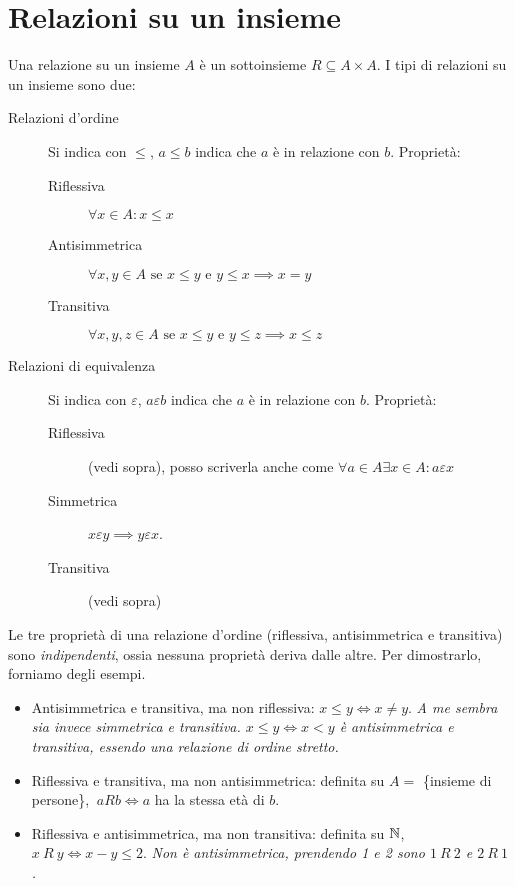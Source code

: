 \section{Relazioni su un insieme}

Una relazione su un insieme $A$ \`e un sottoinsieme $R \subseteq A \times A$. I tipi di relazioni su un insieme sono due:

\begin{description}
    \item[Relazioni d'ordine] Si indica con $\le$, $a \leq b$ indica che $a$ \`e in relazione con $b$. Propriet\`a:
    \begin{description}
        \item [Riflessiva] $\forall x \in A : x \leq x$
        \item [Antisimmetrica] $\forall x, y \in A \text{ se } x \leq y \text{ e }  y \leq x \implies x = y$
        \item [Transitiva] $\forall x, y, z \in A \text{ se } x \leq y \text{ e } y \leq z \implies x \leq z$
    \end{description}
    \item[Relazioni di equivalenza] Si indica con $\varepsilon$, $a \varepsilon b$ indica che $a$ \`e in relazione con $b$. Propriet\`a:
    \begin{description}
      \item [Riflessiva] (vedi sopra), posso scriverla anche come $\forall a \in A \exists x \in A : a \varepsilon x$
      \item [Simmetrica] $x \varepsilon y \implies y \varepsilon x$.
      \item [Transitiva] (vedi sopra)
    \end{description}
\end{description}

Le tre propriet\`a di una relazione d'ordine (riflessiva, antisimmetrica e transitiva) sono \textit{indipendenti}, ossia nessuna propriet\`a deriva dalle altre. Per dimostrarlo, forniamo degli esempi.
\begin{itemize}
  \item Antisimmetrica e transitiva, ma non riflessiva: $x \le y \iff x \neq y$. \textit{A me sembra sia invece simmetrica e transitiva. $x \le y \iff x < y$ \`e antisimmetrica e transitiva, essendo una relazione di ordine stretto.}
  \item Riflessiva e transitiva, ma non antisimmetrica: definita su $A = $ \{insieme di persone\}, $ \ a R b \iff a$ ha la stessa et\`a di $b$.
  \item Riflessiva e antisimmetrica, ma non transitiva: definita su $\mathbb{N}$, $x \ R \ y \iff x - y \le 2$. \textit{Non \`e antisimmetrica, prendendo 1 e 2 sono $1 \ R \ 2$ e $2 \ R \ 1$.}
\end{itemize}

